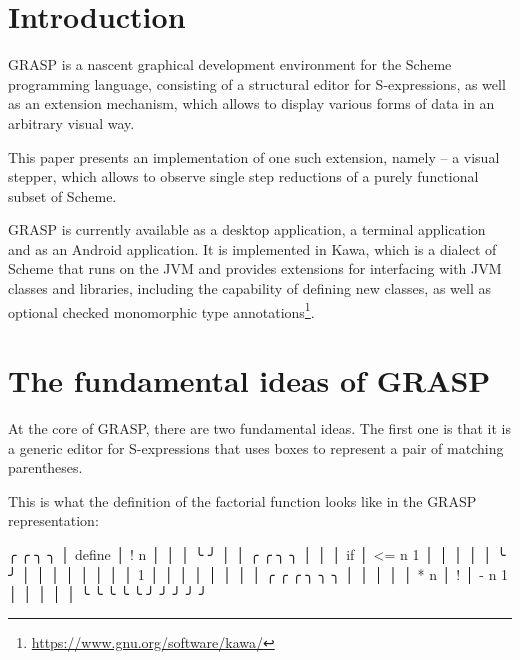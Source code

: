 \documentclass[acmsmall]{acmart}
\newenvironment{Snippet}{\Verbatim[samepage=true]}{\endVerbatim}
\begin{document}

\maketitle

\section{Introduction}

GRASP\cite{Godek2023} is a nascent graphical development environment
for the Scheme programming language, consisting of a structural editor
for S-expressions, as well as an extension mechanism, which allows to
display various forms of data in an arbitrary visual way.

This paper presents an implementation of one such extension, namely --
a visual stepper, which allows to observe single step reductions of a
purely functional subset of Scheme.

GRASP is currently available as a desktop application, a terminal
application and as an Android application.  It is implemented in Kawa,
which is a dialect of Scheme that runs on the JVM and provides
extensions for interfacing with JVM classes and libraries, including
the capability of defining new classes, as well as optional checked
monomorphic type
annotations\footnote{\url{https://www.gnu.org/software/kawa/}}.

\section{The fundamental ideas of GRASP}

At the core of GRASP, there are two fundamental ideas.  The first one
is that it is a generic editor for S-expressions that uses boxes to
represent a pair of matching parentheses.

This is what the definition of the factorial function looks like
in the GRASP representation:

\begin{Snippet}
╭        ╭     ╮                      ╮
│ define │ ! n │                      │
│        ╰     ╯                      │
│   ╭    ╭        ╮                 ╮ │
│   │ if │ <= n 1 │                 │ │
│   │    ╰        ╯                 │ │
│   │                               │ │
│   │       1                       │ │
│   │                               │ │
│   │       ╭     ╭   ╭       ╮ ╮ ╮ │ │
│   │       │ * n │ ! │ - n 1 │ │ │ │ │
╰   ╰       ╰     ╰   ╰       ╯ ╯ ╯ ╯ ╯
\end{Snippet}
\end{document}
